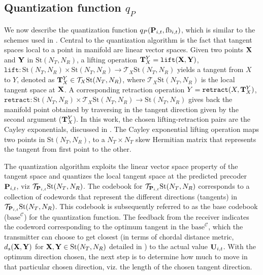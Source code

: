 \documentclass[conference]{IEEEtran}
\begin{document}
\subsection{Quantization function $q_P$}
\label{qp}
We now describe the quantization function $q_P({\bf P}_{i,t},\text{fb}_{i,t})$, which is similar to the schemes used in \cite{6891198,Gupt1905:Predictive,6545375}.
Central to the quantization algorithm is the fact that tangent spaces local to a point in manifold are linear vector spaces.
Given two points ${\bf X}$ and ${\bf Y}$ in $\text{St}(N_T,N_R)$, a lifting operation ${\bf T}^Y_X=\texttt{lift}({\bf X},{\bf Y})$, $\texttt{lift}:\text{St}(N_T,N_R)\times \text{St}(N_T,N_R) \to \mathcal{T}_X \text{St}(N_T,N_R)$ yields a tangent from $X$ to $Y$, denoted as ${\bf T}^Y_X \in \mathcal{T}_X \text{St}(N_T,N_R)$, where $\mathcal{T}_X \text{St}(N_T,N_R)$ is the local tangent space at ${\bf X}$.
A corresponding retraction operation $Y=\texttt{retract}(X,{\bf T}^Y_X)$, $\texttt{retract}: \text{St}(N_T,N_R)\times \mathcal{T}_X \text{St}(N_T,N_R) \to \text{St}(N_T,N_R)$ gives back the manifold point obtained by traversing in the tangent direction given by the second argument (${\bf T}^Y_X$).
In this work, the chosen lifting-retraction pairs are the Cayley exponentials, discussed in \cite{DBLP:journals/corr/abs-1708-00045,Gupt1905:Predictive}. %
The Cayley exponential lifting operation maps two points in $\text{St}(N_T,N_R)$, to a $N_T\times N_T$ skew Hermitian matrix that represents the tangent from first point to the other.

The quantization algorithm exploits the linear vector space property of the tangent space and quantizes the local tangent space at the predicted precoder ${\bf P}_{i,t}$, viz $\mathcal{T}_{{\bf P}_{i,t}} \text{St}(N_T,N_R)$.
The codebook for $\mathcal{T}_{{\bf P}_{i,t}} \text{St}(N_T,N_R)$ corresponds to a collection of codewords that represent the different directions (tangents) in $\mathcal{T}_{{\bf P}_{i,t}} \text{St}(N_T,N_R)$.
This codebook is subsequently referred to as the base codebook ($\text{base}^{\mathcal{C}}$) for the quantization function.
The feedback from the receiver indicates the codeword corresponding to the optimum tangent in the $\text{base}^{\mathcal{C}}$, which the transmitter can choose to get closest (in terms of chordal distance metric, $d_s({\bf X},{\bf Y})$ for ${\bf X},{\bf Y} \in \text{St}(N_T,N_R)$ detailed in \cite{Gupt1905:Predictive,6891198}) to the actual value ${\bf U}_{i,t}$.
With the optimum direction chosen, the next step is to determine how much to move in that particular chosen direction, viz. the length of the chosen tangent direction.
\end{document}
